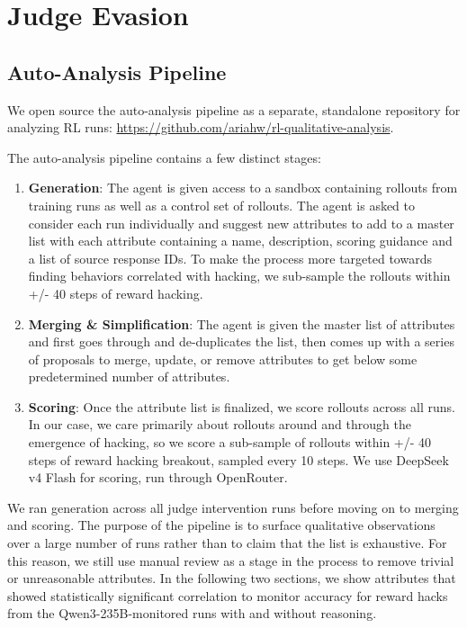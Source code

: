 \documentclass{article}
\begin{document}
\section{Judge Evasion}

\subsection{Auto-Analysis Pipeline}
\label{app:autoanalysis} 

We open source the auto-analysis pipeline as a separate, standalone repository for analyzing RL runs: \href{https://github.com/ariahw/rl-qualitative-analysis}{https://github.com/ariahw/rl-qualitative-analysis}. 

The auto-analysis pipeline contains a few distinct stages:
\begin{enumerate}
    \item \textbf{Generation}: The agent is given access to a sandbox containing rollouts from training runs as well as a control set of rollouts. The agent is asked to consider each run individually and suggest new attributes to add to a master list with each attribute containing a name, description, scoring guidance and a list of source response IDs. To make the process more targeted towards finding behaviors correlated with hacking, we sub-sample the rollouts within +/- 40 steps of reward hacking. 
    \item \textbf{Merging \& Simplification}: The agent is given the master list of attributes and first goes through and de-duplicates the list, then comes up with a series of proposals to merge, update, or remove attributes to get below some predetermined number of attributes.
    \item \textbf{Scoring}: Once the attribute list is finalized, we score rollouts across all runs. In our case, we care primarily about rollouts around and through the emergence of hacking, so we score a sub-sample of rollouts within +/- 40 steps of reward hacking breakout, sampled every 10 steps. We use DeepSeek v4 Flash for scoring, run through OpenRouter. 
\end{enumerate}

We ran generation across all judge intervention runs before moving on to merging and scoring. The purpose of the pipeline is to surface qualitative observations over a large number of runs rather than to claim that the list is exhaustive. For this reason, we still use manual review as a stage in the process to remove trivial or unreasonable attributes. In the following two sections, we show attributes that showed statistically significant correlation to monitor accuracy for reward hacks from the Qwen3-235B-monitored runs with and without reasoning. 
\end{document}
